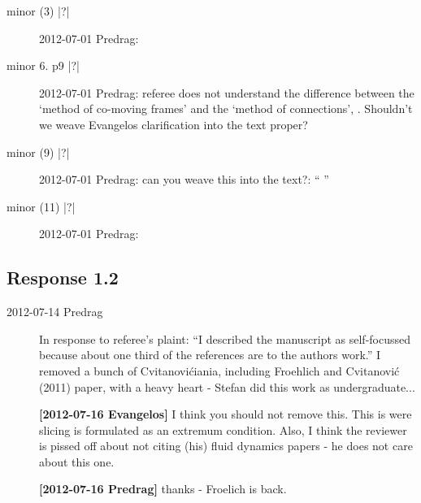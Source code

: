 \begin{description}
\item[minor (3) |?|] 2012-07-01 Predrag:

\item[minor 6. p9 |?|] 2012-07-01 Predrag: referee does not understand the difference between the `method of
 co-moving frames' and the `method of connections', . Shouldn't we
 weave Evangelos clarification into the text proper?

\item[minor (9) |?|] 2012-07-01 Predrag: can you weave this into the text?: ``
''

\item[minor (11) |?|] 2012-07-01 Predrag:

\end{description}

\subsection{Response 1.2}
\label{sect:Response1.2}

\begin{description}

\item[2012-07-14 Predrag] In response to referee's plaint:
``I described the manuscript as self-focussed because about one third of
the references are to the authors work.'' I removed a bunch of
Cvitanovi\'ciania, including Froehlich and Cvitanovi\'c (2011) paper, with
a heavy heart - Stefan did this work as undergraduate...

{\bf [2012-07-16 Evangelos]} I think you should not remove this. This is were
		slicing is formulated as an extremum condition. Also,
		I think the reviewer is pissed off about not citing (his)
		fluid dynamics papers - he does not care about this one.

{\bf [2012-07-16 Predrag]} thanks - Froelich is back.


\end{description}

